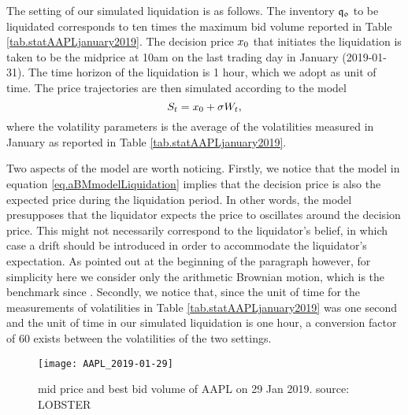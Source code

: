 \documentclass[10pt,a4paper]{article}
\begin{document}
	The setting of our simulated liquidation is as follows. The inventory $\mathfrak{q_0}$ to be liquidated corresponds to ten times the maximum bid volume reported in Table \ref{tab.statAAPLjanuary2019}. The decision price $x_0$  that initiates the liquidation is taken to be the midprice at 10am on the last trading day in January (2019-01-31). The time horizon of the liquidation is 1 hour, which we adopt as unit of time. The price trajectories are then simulated according to the model 
	 \begin{equation}\label{eq.aBMmodelLiquidation}
	 S_t = x_0 + \sigma W_t,
	 \end{equation}
	where the volatility parameters is the average of the volatilities measured in January as reported in Table \ref{tab.statAAPLjanuary2019}.
	
	Two aspects of the model are worth noticing. Firstly, we notice that the model in equation \eqref{eq.aBMmodelLiquidation} implies that the decision price is also the expected price during the liquidation period. In other words, the model presupposes that the liquidator expects the price to oscillates around the decision price. This might not necessarily correspond to the liquidator's belief, in which case a drift should be introduced in order to accommodate the liquidator's expectation. As pointed out at the beginning of the  paragraph however, for simplicity here we consider only the arithmetic Brownian motion, which is the benchmark since \cite{AC00opt}.
	Secondly, we notice that, since the unit of time for the  measurements of volatilities in Table \ref{tab.statAAPLjanuary2019} was one second and the unit of time in our simulated liquidation is one hour, a conversion factor of 60 exists between the volatilities of the two settings.  	
	
	\begin{center}
		\begin{figure}
			\centering
			\texttt{[image: AAPL\_2019-01-29]}
			\caption{{mid price and best bid volume of AAPL on 29 Jan 2019. source: LOBSTER}}
			\label{fig.AAPL_20190129}
		\end{figure}
		
	\end{center}
	
\end{document}
